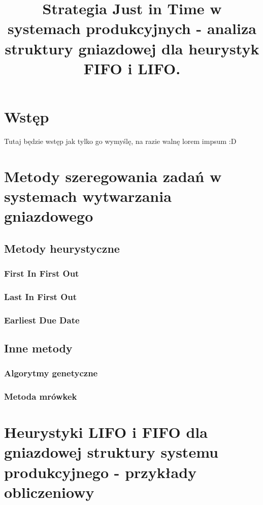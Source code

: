 \documentclass[twoside]{pracaInzynierskaMS}
\title{Strategia Just in Time w systemach produkcyjnych - analiza struktury gniazdowej dla heurystyk\\ FIFO i LIFO.}
\begin{document}
\section        {Wstęp}

Tutaj będzie wstęp \cite{Poz1} jak tylko go wymyślę, na razie walnę lorem impsum :D \\

\section        [Metody szeregowania zadań \ldots]
		        {Metody szeregowania zadań w systemach wytwarzania gniazdowego}

\subsection     {Metody heurystyczne}
\subsubsection  {First In First Out}

\subsubsection  {Last In First Out}

\subsubsection  {Earliest Due Date}



\subsection     {Inne metody}
\subsubsection  {Algorytmy genetyczne}

\subsubsection  {Metoda mrówkek}


\section        [Heurystyki LIFO i FIFO \ldots]
                {Heurystyki LIFO i FIFO dla gniazdowej struktury systemu produkcyjnego - przykłady obliczeniowy}
\end{document}
